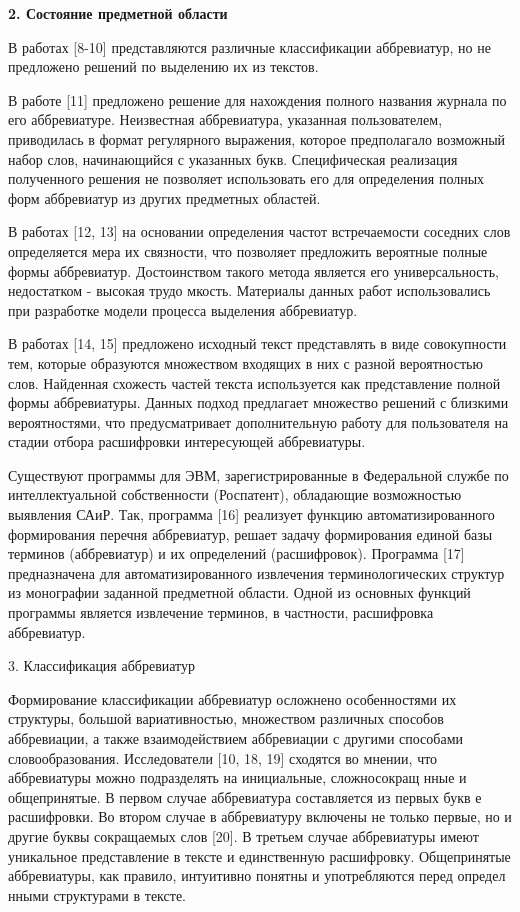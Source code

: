 \documentclass[a4paper]{article}
\begin{document}
\textbf{2. Состояние предметной области}

В работах [8-10] представляются различные классификации аббревиатур, но не предложено решений по выделению их из текстов.

В работе [11] предложено решение для нахождения полного названия журнала по его аббревиатуре. Неизвестная аббревиатура, указанная пользователем, приводилась в формат регулярного выражения, которое предполагало возможный набор слов, начинающийся с указанных букв. Специфическая реализация полученного решения не позволяет использовать его для определения полных форм аббревиатур из других предметных областей.

В работах [12, 13] на основании определения частот встречаемости соседних слов определяется мера их связности, что позволяет предложить вероятные полные формы аббревиатур. Достоинством такого метода является его универсальность, недостатком - высокая трудо мкость. Материалы данных работ использовались при разработке модели процесса выделения аббревиатур.

В работах [14, 15] предложено исходный текст представлять в виде совокупности тем, которые образуются множеством входящих в них с разной вероятностью слов. Найденная схожесть частей текста используется как представление полной формы аббревиатуры. Данных подход предлагает множество решений с близкими вероятностями, что предусматривает дополнительную работу для пользователя на стадии отбора расшифровки интересующей аббревиатуры.

Существуют программы для ЭВМ, зарегистрированные в Федеральной службе по интеллектуальной собственности (Роспатент), обладающие возможностью выявления САиР. Так, программа [16] реализует функцию автоматизированного формирования перечня аббревиатур, решает задачу формирования единой базы терминов (аббревиатур) и их определений (расшифровок). Программа [17] предназначена для автоматизированного извлечения терминологических структур из монографии заданной предметной области. Одной из основных функций программы является извлечение терминов, в частности, расшифровка аббревиатур.

3. Классификация аббревиатур

Формирование классификации аббревиатур осложнено особенностями их структуры, большой вариативностью, множеством различных способов аббревиации, а также взаимодействием аббревиации с другими способами словообразования. Исследователи [10, 18, 19] сходятся во мнении, что аббревиатуры можно подразделять на инициальные, сложносокращ нные и общепринятые. В первом случае аббревиатура составляется из первых букв е расшифровки. Во втором случае в аббревиатуру включены не только первые, но и другие буквы сокращаемых слов [20]. В третьем случае аббревиатуры имеют уникальное представление в тексте и единственную расшифровку. Общепринятые аббревиатуры, как правило, интуитивно
понятны и употребляются перед определ нными структурами в тексте.
\end{document}

